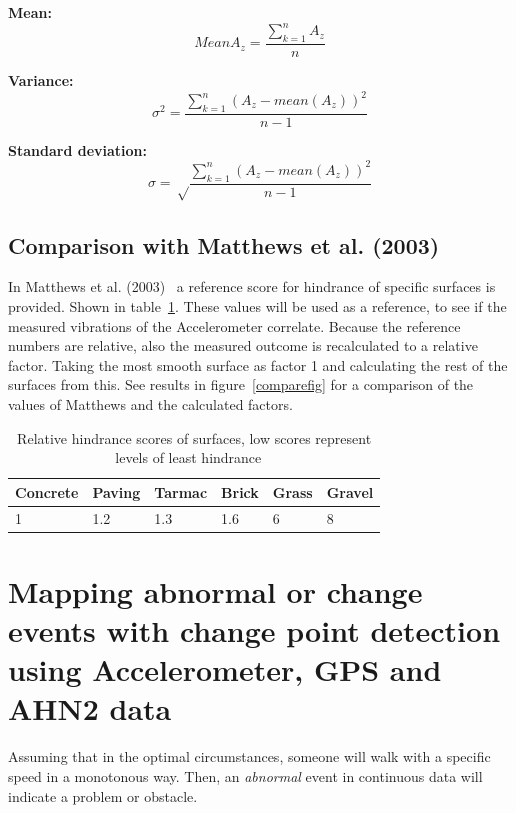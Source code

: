 \textbf{Mean:}  
\begin{equation}
Mean A_{z} = \frac{\sum_{k=1}^n A_{z}}{n}
\end{equation}

\textbf{Variance:}
\begin{equation}
\sigma^2 = \frac{\sum_{k=1}^n (A_{z}- mean(A_{z}))^2}{n-1}
\end{equation}

\textbf{Standard deviation:}
\begin{equation}
\sigma = \sqrt \frac{\sum_{k=1}^n (A_{z}- mean(A_{z}))^2}{n-1}
\end{equation}

\subsection{Comparison with Matthews et al. (2003)}
In Matthews et al. (2003)~\cite{Matthews2003} a reference score for hindrance of specific surfaces is provided. Shown in table~\ref{hindrance}. These values will be used as a reference, to see if the measured vibrations of the Accelerometer correlate. Because the reference numbers are relative, also the measured outcome is recalculated to a relative factor. Taking the most smooth surface as factor 1 and calculating the rest of the surfaces from this. See results in figure~\ref{comparefig} for a comparison of the values of Matthews and the calculated factors. 

\begin{table}[h]
\caption[Relative hindrance scores of surfaces]{Relative hindrance scores of surfaces, low scores represent levels of least hindrance ~\cite{Matthews2003} \label{hindrance}}
\centering
\begin{tabular}{|l|l|l|l|l|l|}
	\hline
	Concrete & Paving & Tarmac & Brick & Grass & Gravel\\
	\hline
	1 & 1.2 & 1.3 & 1.6 & 6 & 8 \\
	\hline
\end{tabular}
\end{table}

\section{Mapping abnormal or change events with change point detection using Accelerometer, GPS and AHN2 data}

Assuming that in the optimal circumstances, someone will walk with a specific speed in a monotonous way. Then, an \emph{abnormal} event in continuous data will indicate a problem or obstacle. 

